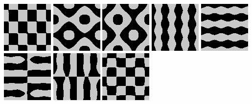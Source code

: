 \includegraphics{o/chladni_041.png}
\includegraphics{o/chladni_042.png}
\includegraphics{o/chladni_043.png}
\includegraphics{o/chladni_044.png}
\includegraphics{o/chladni_045.png}
\includegraphics{o/chladni_046.png}
\includegraphics{o/chladni_047.png}
\includegraphics{o/chladni_048.png}

